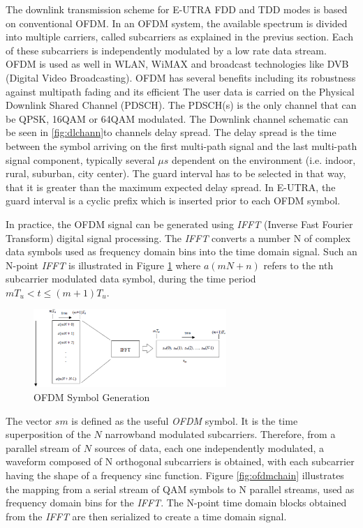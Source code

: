  The downlink transmission scheme for E-UTRA FDD and TDD modes is based on
conventional OFDM. In an OFDM system, the available spectrum is divided into
multiple carriers, called subcarriers as explained in the previus section. Each
of these subcarriers is independently modulated by a low rate data stream. OFDM
is used as well in WLAN, WiMAX and broadcast technologies like DVB (Digital
Video Broadcasting). OFDM has several benefits including its robustness against
multipath fading and its efficient The user data is carried on the Physical
Downlink Shared Channel (PDSCH). The PDSCH(s) is the only channel that can be
QPSK, 16QAM or 64QAM modulated. The Downlink channel schematic can be seen in
\ref{fig:dlchann}to channels delay spread. The delay spread is the time between
the symbol arriving on the first multi-path signal and the last multi-path
signal component, typically several $\mu s$ dependent on the environment (i.e.
indoor, rural, suburban, city center). The guard interval has to be selected in
that way, that it is greater than the maximum expected delay spread. In E-UTRA,
the guard interval is a cyclic prefix which is inserted prior to each OFDM
symbol.

In practice, the OFDM signal can be generated using \textit{IFFT} (Inverse Fast Fourier
Transform) digital signal processing. The \textit{IFFT} converts a number N of complex
data symbols used as frequency domain bins into the time domain signal. Such an
N-point \textit{IFFT} is illustrated in Figure \ref{fig:ofdmsymbol} where $a(mN+n)$
refers to the nth subcarrier modulated data symbol, during the time period $mT_u <
t \le (m+1)T_u$.

\begin{figure}[htbp]
    \centering
    \includegraphics[width=0.65\textwidth]{./figures/ofdm_symbol_gen}
    \caption{ OFDM Symbol Generation
    \label{fig:ofdmsymbol}}
\end{figure}

The vector $sm$ is defined as the useful \textit{OFDM} symbol. It is the time
superposition of the $N$ narrowband modulated subcarriers. Therefore, from a
parallel stream of $N$ sources of data, each one independently modulated, a
waveform composed of N orthogonal subcarriers is obtained, with each subcarrier
having the shape of a frequency sinc function. Figure \ref{fig:ofdmchain}
illustrates the mapping from a serial stream of QAM symbols to N parallel
streams, used as frequency domain bins for the \textit{IFFT}. The N-point time domain
blocks obtained from the \textit{IFFT} are then serialized to create a time domain
signal.

